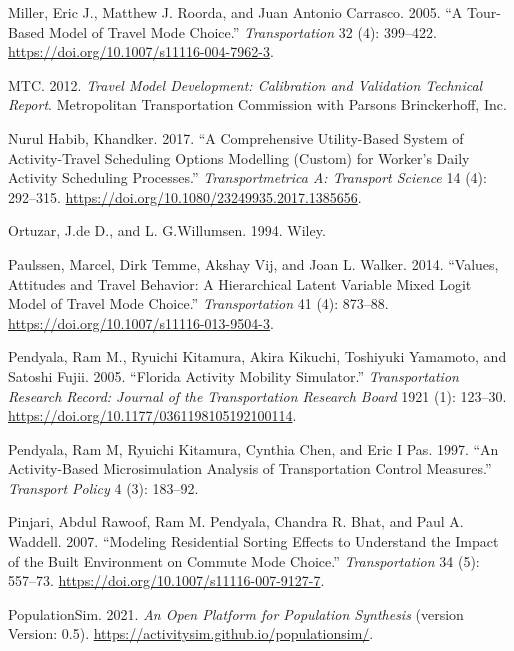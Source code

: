 \documentclass[12pt, oneside, openright]{byuthesis}
\newlength{\cslhangindent}
\newlength{\cslentryspacingunit} %
\newenvironment{CSLReferences}[2] %
 {%
  \setlength{\parindent}{0pt}
  \ifodd #1
  \let\oldpar\par
  \def\par{\hangindent=\cslhangindent\oldpar}
  \fi
  \setlength{\parskip}{#2\cslentryspacingunit}
 }%
 {}
\begin{document}
\begin{CSLReferences}{1}{0}
\leavevmode{}%
Miller, Eric J., Matthew J. Roorda, and Juan Antonio Carrasco. 2005. {``A Tour-Based Model of Travel Mode Choice.''} \emph{Transportation} 32 (4): 399--422. \url{https://doi.org/10.1007/s11116-004-7962-3}.

\leavevmode{}%
MTC. 2012. \emph{Travel Model Development: Calibration and Validation Technical Report}. Metropolitan Transportation Commission with Parsons Brinckerhoff, Inc.

\leavevmode{}%
Nurul Habib, Khandker. 2017. {``A Comprehensive Utility-Based System of Activity-Travel Scheduling Options Modelling (Custom) for Worker's Daily Activity Scheduling Processes.''} \emph{Transportmetrica A: Transport Science} 14 (4): 292--315. \url{https://doi.org/10.1080/23249935.2017.1385656}.

\leavevmode{}%
Ortuzar, J.de D., and L. G.Willumsen. 1994. Wiley.

\leavevmode{}%
Paulssen, Marcel, Dirk Temme, Akshay Vij, and Joan L. Walker. 2014. {``Values, Attitudes and Travel Behavior: A Hierarchical Latent Variable Mixed Logit Model of Travel Mode Choice.''} \emph{Transportation} 41 (4): 873--88. \url{https://doi.org/10.1007/s11116-013-9504-3}.

\leavevmode{}%
Pendyala, Ram M., Ryuichi Kitamura, Akira Kikuchi, Toshiyuki Yamamoto, and Satoshi Fujii. 2005. {``Florida Activity Mobility Simulator.''} \emph{Transportation Research Record: Journal of the Transportation Research Board} 1921 (1): 123--30. \url{https://doi.org/10.1177/0361198105192100114}.

\leavevmode{}%
Pendyala, Ram M, Ryuichi Kitamura, Cynthia Chen, and Eric I Pas. 1997. {``An Activity-Based Microsimulation Analysis of Transportation Control Measures.''} \emph{Transport Policy} 4 (3): 183--92.

\leavevmode{}%
Pinjari, Abdul Rawoof, Ram M. Pendyala, Chandra R. Bhat, and Paul A. Waddell. 2007. {``Modeling Residential Sorting Effects to Understand the Impact of the Built Environment on Commute Mode Choice.''} \emph{Transportation} 34 (5): 557--73. \url{https://doi.org/10.1007/s11116-007-9127-7}.

\leavevmode{}%
PopulationSim. 2021. \emph{An Open Platform for Population Synthesis} (version Version: 0.5). \url{https://activitysim.github.io/populationsim/}.


\end{CSLReferences}
\end{document}
